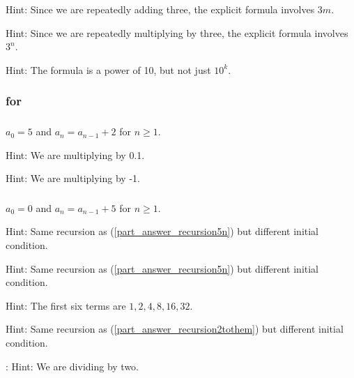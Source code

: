 \subsubsection*{ \answers}
\begin{apart}
    \item Hint: Since we are repeatedly adding three, the explicit formula involves $3m$.
    \item Hint: Since we are repeatedly multiplying by three, the explicit formula involves $3^n$.
    \item Hint: The formula is a power of 10, but not just $10^k$.
\end{apart}

\subsubsection{\answers for   \subntr}

\subsubsection*{ \answers}
\begin{apart}
    \item $a_0=5$ and $a_n=a_{n-1}+2$ for $n \ge 1$.
    \item Hint: We are multiplying by 0.1.
    \item Hint: We are multiplying by -1.
\end{apart}

\subsubsection*{ \answers}
\begin{apart}
    \item \label{part_answer_recursion5n} $a_0=0$ and $a_n=a_{n-1}+5$ for $n \ge 1$.
    \item Hint: Same recursion as (\ref{part_answer_recursion5n}) but different initial condition.
    \item Hint: Same recursion as (\ref{part_answer_recursion5n}) but different initial condition.
    \item \label{part_answer_recursion2tothem} Hint: The first six terms are $1, 2, 4, 8, 16, 32$.
    \item Hint: Same recursion as (\ref{part_answer_recursion2tothem}) but different initial condition. 
    \item: Hint: We are dividing by two.
\end{apart}

